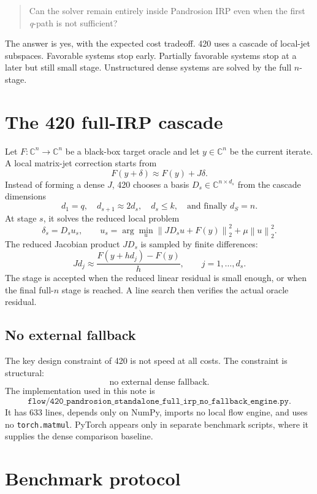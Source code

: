 \documentclass[11pt]{article}
\newcommand{\C}{\mathbb C}
\newcommand{\norm}[1]{\left\lVert #1\right\rVert}
\newcommand{\qpath}{\textit{q}\nobreakdash-path}
\begin{document}
\begin{quote}
Can the solver remain entirely inside Pandrosion IRP even when the first
\qpath{} is not sufficient?
\end{quote}

The answer is yes, with the expected cost tradeoff.  420 uses a cascade of
local-jet subspaces.  Favorable systems stop early.  Partially favorable systems
stop at a later but still small stage.  Unstructured dense systems are solved by
the full \(n\)-stage.

\section{The 420 full-IRP cascade}

Let \(F:\C^n\to\C^n\) be a black-box target oracle and let \(y\in\C^n\) be the
current iterate.  A local matrix-jet correction starts from
\[
        F(y+\delta)\approx F(y)+J\delta.
\]
Instead of forming a dense \(J\), 420 chooses a basis \(D_s\in\C^{n\times d_s}\)
from the cascade dimensions
\[
        d_1=q,\quad d_{s+1}\approx 2d_s,\quad d_s\le k,\quad
        \text{and finally } d_S=n.
\]
At stage \(s\), it solves the reduced local problem
\[
        \delta_s = D_s u_s,\qquad
        u_s = \arg\min_u \norm{J D_s u + F(y)}_2^2+\mu\norm{u}_2^2.
\]
The reduced Jacobian product \(JD_s\) is sampled by finite differences:
\[
        Jd_j\approx \frac{F(y+h d_j)-F(y)}{h},
        \qquad j=1,\ldots,d_s.
\]
The stage is accepted when the reduced linear residual is small enough, or when
the final full-\(n\) stage is reached.  A line search then verifies the actual
oracle residual.

\subsection{No external fallback}

The key design constraint of 420 is not speed at all costs.  The constraint is
structural:
\[
        \text{no external dense fallback.}
\]
The implementation used in this note is
\[
\texttt{flow/420\_pandrosion\_standalone\_full\_irp\_no\_fallback\_engine.py}.
\]
It has 633 lines, depends only on NumPy, imports no local flow engine, and uses
no \texttt{torch.matmul}.  PyTorch appears only in separate benchmark scripts,
where it supplies the dense comparison baseline.

\section{Benchmark protocol}
\end{document}
